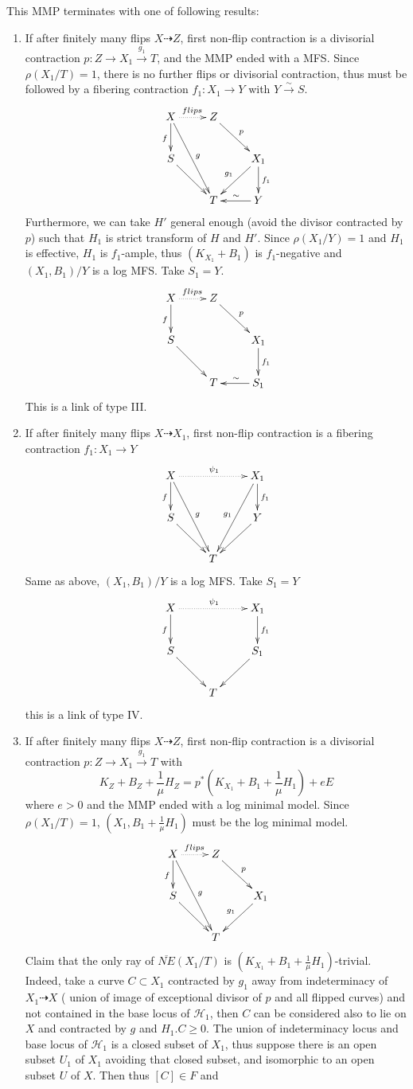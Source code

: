 \documentclass{article}
\begin{document}
\begin{enumerate}[step 1]
This MMP terminates with one of following results: 
\begin{enumerate}[1)]
\item If after finitely many flips $ X\dashrightarrow Z $, first non-flip contraction is a divisorial contraction $ p:Z\to X_1\xrightarrow{g_1}T $, and the MMP ended with a MFS.  Since $ \rho(X_1/T)=1 $, there is no further flips or divisorial contraction, thus must be followed by a fibering contraction $ f_1:X_1\to Y $ with $ Y\xrightarrow{\sim}S $.
$$ \xymatrix{
X\ar[d]_f\ar[ddr]^g\ar@{.>}[r]^{flips}&Z\ar[rd]^{p}&\\
S\ar[dr]&&X_1\ar[d]^{f_1}\ar[ld]_{g_1}\\
&T&Y\ar[l]_\sim}$$
Furthermore, we can take $ H' $ general enough (avoid the divisor contracted by $ p $) such that $ H_1 $ is strict transform of $ H $ and $ H' $. Since $ \rho(X_1/Y)=1 $ and $ H_1 $ is effective, $ H_1 $ is $ f_1 $-ample, thus $ (K_{X_1}+B_1) $ is $ f_1 $-negative and $ (X_1,B_1)/Y $ is a log MFS.  Take $ S_1=Y $.
$$ \xymatrix{
X\ar[d]_f\ar@{.>}[r]^{flips}&Z\ar[rd]^{p}&\\
S\ar[dr]&&X_1\ar[d]^{f_1}\\
&T&S_1\ar[l]_\sim}$$
This is a link of type III. 	
\item If after finitely many flips $ X\dashrightarrow X_1 $, first non-flip contraction is a fibering contraction $ f_1:X_1\to Y  $
$$ \xymatrix{
X\ar[d]_f\ar[ddr]^g\ar@{.>}[rr]^{\psi_1}&&X_1\ar[d]^{f_1}\ar[ddl]_{g_1}\\
S\ar[dr]&&Y\ar[dl]\\
&T &}$$
Same as above, $ (X_1,B_1)/Y $ is a log MFS. Take $ S_1=Y $
$$ \xymatrix{
X\ar[d]_f\ar@{.>}[rr]^{\psi_1}&&X_1\ar[d]^{f_1}\\
S\ar[dr]&&S_1\ar[dl]\\
&T &}$$
this is a link of type IV. 
\item If after finitely many flips $ X\dashrightarrow Z $, first non-flip contraction is a divisorial contraction $ p:Z\to X_1\xrightarrow{g_1}T $ with 
$$ K_Z+B_Z+\frac{1}{\mu}H_Z=p^*(K_{X_1}+B_1+\frac{1}{\mu}H_1)+eE $$
where $ e>0 $ and the MMP ended with a log minimal model. Since  $ \rho(X_1/T)=1 $, $ (X_1,B_1+\frac{1}{\mu}H_1) $ must be the log minimal model.
$$ \xymatrix{
X\ar[d]_f\ar[ddr]^g\ar@{.>}[r]^{flips}&Z\ar[rd]^{p}&\\
S\ar[dr]&&X_1\ar[dl]_{g_1}\\
&T&}$$
Claim that the only ray of $ \overline{NE}(X_1/T) $ is $ (K_{X_1}+B_1+\frac{1}{\mu}H_1) $-trivial. Indeed, take a curve $ C\subset X_1 $ contracted by $ g_1 $ away from indeterminacy of $ X_1\dashrightarrow X $ ( union of image of exceptional divisor of $ p $ and all flipped curves) and not contained in the base locus of $ \mathcal{H}_1 $, then $ C $ can be considered also to lie on $ X $ and contracted by $ g $ and $ H_1.C\geqslant 0 $.  The union of  indeterminacy locus and base locus of $ \mathcal{H}_1 $ is a closed subset of $ X_1 $, thus suppose there is an open subset $ U_1 $ of $ X_1 $ avoiding that closed subset, and  isomorphic to an open subset $ U $ of $ X $. Then  thus $ [C]\in F $ and

\end{enumerate}
\end{enumerate}
\end{document}
